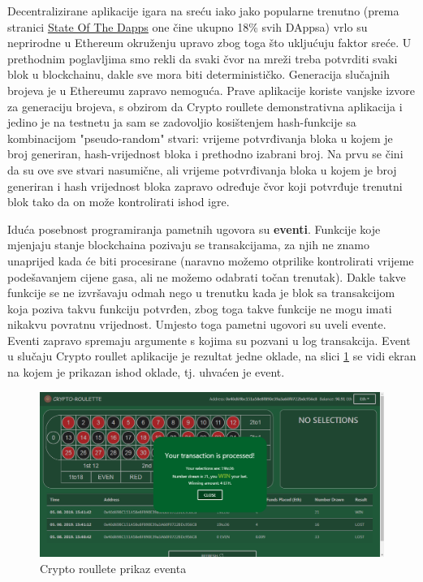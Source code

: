 \documentclass[12pt]{report}
\begin{document}
Decentralizirane aplikacije igara na sreću iako jako popularne trenutno (prema stranici \href{https://www.stateofthedapps.com/}{State Of The Dapps} one čine ukupno 18\% svih DAppsa) vrlo su neprirodne u Ethereum okruženju upravo zbog toga što ukljućuju faktor sreće. U prethodnim poglavljima smo rekli da svaki čvor na mreži treba potvrditi svaki blok u blockchainu, dakle sve mora biti determinističko. Generacija slučajnih brojeva je u Ethereumu zapravo nemoguća. Prave aplikacije koriste vanjske izvore za generaciju brojeva, s obzirom da Crypto roullete demonstrativna aplikacija i jedino je na testnetu ja sam se zadovoljio kosištenjem hash-funkcije sa kombinacijom "pseudo-random" stvari: vrijeme potvrđivanja bloka u kojem je broj generiran, hash-vrijednost bloka i prethodno izabrani broj. Na prvu se čini da su ove sve stvari nasumične, ali vrijeme potvrđivanja bloka u kojem je broj generiran i hash vrijednost bloka zapravo određuje čvor koji potvrđuje trenutni blok tako da on može kontrolirati ishod igre.

Iduća posebnost programiranja pametnih ugovora su \textbf{eventi}. Funkcije koje mjenjaju stanje blockchaina pozivaju se transakcijama, za njih ne znamo unaprijed kada će biti procesirane (naravno možemo otprilike kontrolirati vrijeme podešavanjem cijene gasa, ali ne možemo odabrati točan trenutak). Dakle takve funkcije se ne izvršavaju odmah nego u trenutku kada je blok sa transakcijom koja poziva takvu funkciju potvrđen, zbog toga takve funkcije ne mogu imati nikakvu povratnu vrijednost. Umjesto toga pametni ugovori su uveli evente. Eventi zapravo spremaju argumente s kojima su pozvani u log transakcija. Event u slučaju Crypto roullet aplikacije je rezultat jedne oklade, na slici \ref{fig:result} se vidi ekran na kojem je prikazan ishod oklade, tj. uhvaćen je event.

\begin{figure}[h]
\centering
\includegraphics[scale=0.44]{result}
\caption{Crypto roullete prikaz eventa}
\label{fig:result}
\end{figure}
\end{document}
